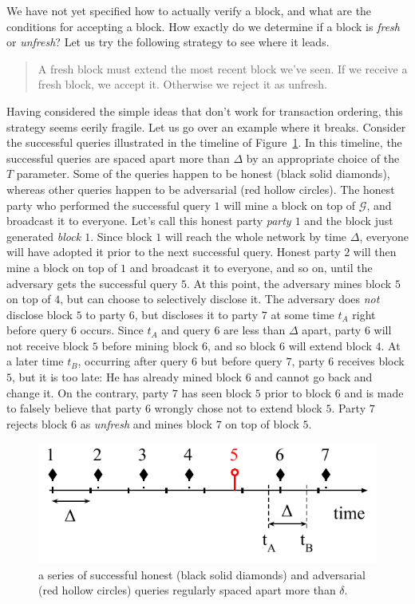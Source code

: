We have not yet specified how to actually verify a block, and what are the conditions for
accepting a block. How exactly do we determine if a block is \emph{fresh} or \emph{unfresh}? Let
us try the following strategy to see where it leads.

\begin{quote}
A fresh block must extend the most recent block we've seen. If we receive a fresh block, we accept
it. Otherwise we reject it as unfresh.
\end{quote}

Having considered the simple ideas that don't work for transaction ordering, this strategy
seems eerily fragile. Let us go over an example where it breaks. Consider the
successful queries illustrated in the timeline of
Figure~\ref{fig.regular-adv-honest-queries}. In this timeline, the successful queries are spaced
apart more than $\Delta$ by an appropriate choice of the $T$ parameter. Some of the queries happen
to be honest (black solid diamonds), whereas other queries happen to be adversarial (red hollow circles).
The honest party who performed the successful query $1$ will mine a block on top of $\mathcal{G}$,
and broadcast it to everyone. Let's call this honest party \emph{party $1$} and the block just generated
\emph{block $1$}. Since block $1$ will reach the whole network by time $\Delta$,
everyone will have adopted it prior to the next successful query. Honest party $2$ will then
mine a block on top of $1$ and broadcast it to everyone, and so on, until the adversary gets
the successful query $5$. At this point, the adversary mines block $5$ on top of $4$, but can choose
to selectively disclose it. The adversary does \emph{not} disclose block $5$ to party $6$,
but discloses it to party $7$ at some time $t_A$ right before query $6$ occurs. Since $t_A$ and
query $6$ are less than $\Delta$ apart, party $6$ will not receive block $5$ before mining block $6$,
and so block $6$ will extend block $4$. At a later time $t_B$, occurring after query $6$ but before query $7$,
party $6$ receives block $5$, but
it is too late: He has already mined block $6$ and cannot go back and change it.
On the contrary, party $7$ has seen block $5$ prior to block $6$ and is made to falsely believe
that party $6$ wrongly chose not to extend block $5$. Party $7$ rejects block $6$ as \emph{unfresh}
and mines block $7$ on top of block $5$.

\begin{figure}[h]
    \centering
    \includegraphics[width=0.4 \columnwidth,keepaspectratio]{figures/regular-adv-honest-queries.pdf}
    \caption{a series of successful honest (black solid diamonds) and adversarial (red hollow circles) queries
             regularly spaced apart more than $\delta$.}
    \label{fig.regular-adv-honest-queries}
\end{figure}


